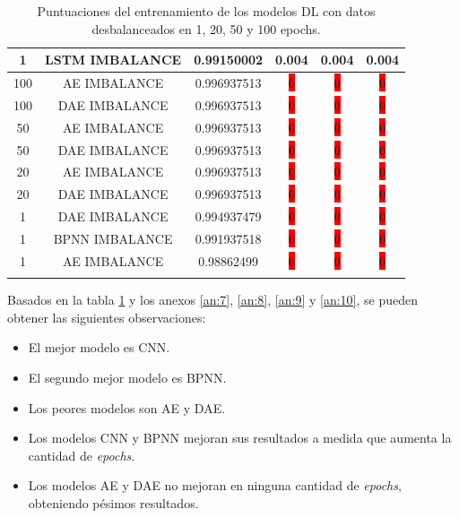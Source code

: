 \begin{longtable}{|c|c|c|c|c|c|}
  	1 & LSTM IMBALANCE & 0.99150002 & 0.004 & 0.004 & 0.004\\ \hline
  	100 & AE IMBALANCE & 0.996937513 & \colorbox{red}{0} & \colorbox{red}{0} & \colorbox{red}{0}\\ \hline
  	100 & DAE IMBALANCE & 0.996937513 & \colorbox{red}{0} & \colorbox{red}{0} & \colorbox{red}{0}\\ \hline
  	50 & AE IMBALANCE & 0.996937513 & \colorbox{red}{0} & \colorbox{red}{0} & \colorbox{red}{0}\\ \hline
  	50 & DAE IMBALANCE & 0.996937513 & \colorbox{red}{0} & \colorbox{red}{0} & \colorbox{red}{0}\\ \hline
  	20 & AE IMBALANCE & 0.996937513 & \colorbox{red}{0} & \colorbox{red}{0} & \colorbox{red}{0}\\ \hline
  	20 & DAE IMBALANCE & 0.996937513 & \colorbox{red}{0} & \colorbox{red}{0} & \colorbox{red}{0}\\ \hline
  	1 & DAE IMBALANCE & 0.994937479 & \colorbox{red}{0} & \colorbox{red}{0} & \colorbox{red}{0}\\ \hline
  	1 & BPNN IMBALANCE & 0.991937518 & \colorbox{red}{0} & \colorbox{red}{0} & \colorbox{red}{0}\\ \hline
  	1 & AE IMBALANCE & 0.98862499 & \colorbox{red}{0} & \colorbox{red}{0} & \colorbox{red}{0}\\ \hline
  	\caption{Puntuaciones del entrenamiento de los modelos DL con datos desbalanceados en 1, 20, 50 y 100 epochs.}
  	\label{t:12}
  \end{longtable}

  Basados en la tabla \ref{t:12} y los anexos \ref{an:7}, \ref{an:8}, \ref{an:9} y \ref{an:10}, se pueden obtener las siguientes observaciones:
  \begin{itemize}
  	\item El mejor modelo es CNN.
  	\item El segundo mejor modelo es BPNN.
  	\item Los peores modelos son AE y DAE.
  	\item Los modelos CNN y BPNN mejoran sus resultados a medida que aumenta la cantidad de \textit{epochs}.
  	\item Los modelos AE y DAE no mejoran en ninguna cantidad de \textit{epochs}, obteniendo p\'{e}simos resultados.
  \end{itemize}

